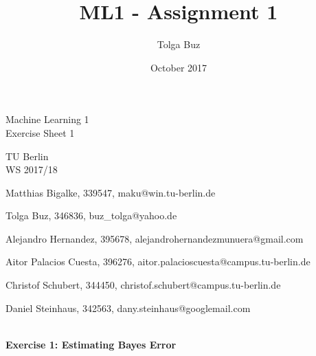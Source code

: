 \documentclass{article}
\title{ML1 - Assignment 1}
\author{Tolga Buz}
\date{October 2017}
\begin{document}
\begin{centering}
\begin{LARGE}
Machine Learning 1 \\
Exercise Sheet 1 \\
\end{LARGE}
\vspace{0.5cm}
TU Berlin\\
WS 2017/18
\vspace{0.5cm}
\hline

\begin{description}
\item[Group: BSSBCH]
\item Matthias Bigalke, 339547, maku@win.tu-berlin.de 
\item Tolga Buz, 346836, buz\_tolga@yahoo.de 
\item Alejandro Hernandez, 395678, alejandrohernandezmunuera@gmail.com 
\item Aitor Palacios Cuesta, 396276, aitor.palacioscuesta@campus.tu-berlin.de 
\item Christof Schubert, 344450, christof.schubert@campus.tu-berlin.de 
\item Daniel Steinhaus, 342563, dany.steinhaus@googlemail.com 
\end{description}
\end{centering}

\hline

\begin{verbatim}
\end{verbatim}

\paragraph{Exercise 1: Estimating Bayes Error}
\end{document}
